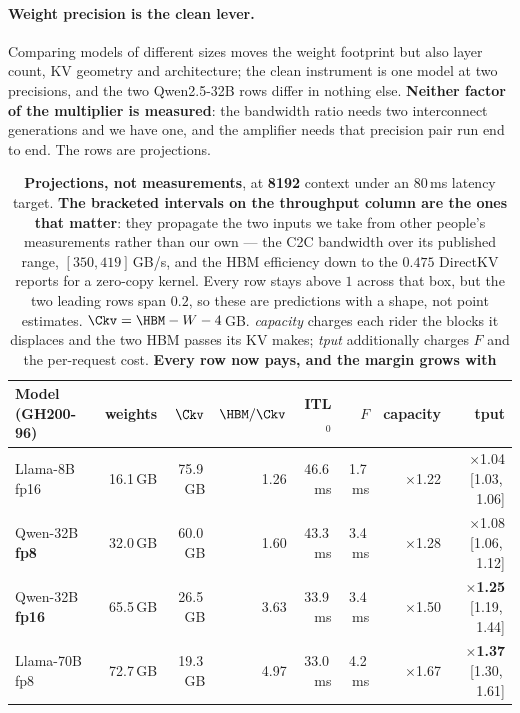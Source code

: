 \paragraph{Weight precision is the clean lever.} Comparing models of different
sizes moves the weight footprint but also layer count, KV geometry and
architecture; the clean instrument is one model at two precisions, and the two
Qwen2.5-32B rows differ in nothing else. \textbf{Neither factor of the multiplier
is measured}: the bandwidth ratio needs two interconnect generations and we have
one, and the amplifier needs that precision pair run end to end. The rows are
projections.

\begin{table}[t]
\centering
\small
\begin{tabular}{lrrrrrrr}
\toprule
Model (GH200-96) & weights & $\Ckv$ & $\HBM/\Ckv$ & ITL$_0$ & $F$ & capacity & tput \\
\midrule
Llama-8B fp16          & 16.1\,GB & 75.9\,GB & 1.26 & 46.6\,ms & \phantom{0}1.7\,ms & $\times$1.22 & $\times$1.04 \footnotesize[1.03,\,1.06] \\
Qwen-32B \textbf{fp8}  & 32.0\,GB & 60.0\,GB & 1.60 & 43.3\,ms & \phantom{0}3.4\,ms & $\times$1.28 & $\times$1.08 \footnotesize[1.06,\,1.12] \\
Qwen-32B \textbf{fp16} & 65.5\,GB & 26.5\,GB & 3.63 & 33.9\,ms & \phantom{0}3.4\,ms & $\times$1.50 & $\times$\textbf{1.25} \footnotesize[1.19,\,1.44] \\
Llama-70B fp8          & 72.7\,GB & 19.3\,GB & 4.97 & 33.0\,ms & \phantom{0}4.2\,ms & $\times$1.67 & $\times$\textbf{1.37} \footnotesize[1.30,\,1.61] \\
\bottomrule
\end{tabular}
\caption{\textbf{Projections, not measurements}, at \textbf{8192} context under an
$80$\,ms latency target. \textbf{The bracketed intervals on the throughput column
are the ones that matter}: they propagate the two inputs we take from other
people's measurements rather than our own --- the C2C bandwidth over its published
range, $[350, 419]$\,GB/s, and the HBM efficiency down to the $0.475$ DirectKV
reports for a zero-copy kernel. Every row stays above $1$ across that box, but the
two leading rows span $0.2$, so these are predictions with a shape, not point
estimates.
$\Ckv = \HBM - W - 4$\,GB. \emph{capacity} charges each rider the blocks it
displaces and the two HBM passes its KV makes; \emph{tput} additionally charges $F$
and the per-request cost. \textbf{Every row now pays, and the margin grows with
}}
\end{table}

